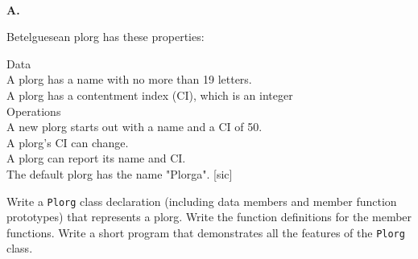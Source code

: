 \documentclass[10 pt]{amsart}
\newlength{\cwidth}
\newenvironment{cpart}[2][\cwidth]
	{\\ \phantom{\qquad}\textbf{#2. }\begin{minipage}[t]{#1}}
	{\end{minipage}}
\newcommand{\ttt}[1]{\texttt{#1}}
\begin{document}
	\begin{cpart}{7}
		A Betelguesean plorg has these properties:
		\begin{spacing}{1.5}
			Data \\
			\phantom{\hspace{6ex}} 
				A plorg has a name with no more than 19 letters.\\
			\phantom{\hspace{6ex}} 
			A plorg has a contentment index (CI), which is an integer \\
			Operations \\
			\phantom{\hspace{6ex}} 
				A new plorg starts out with a name and a CI of 50. \\
			\phantom{\hspace{6ex}} 
				A plorg's CI can change. \\
			\phantom{\hspace{6ex}} 
				A plorg can report its name and CI. \\
			\phantom{\hspace{6ex}} 
				The default plorg has the name "Plorga". [sic]
		\end{spacing}
		Write a \ttt{Plorg} class declaration (including data members
		and member function prototypes) that represents a plorg.
		Write the function definitions for the member functions.
		Write a short program that demonstrates all the features
		of the \ttt{Plorg} class.
	\end{cpart}
	\vspace{2ex}
\end{document}
